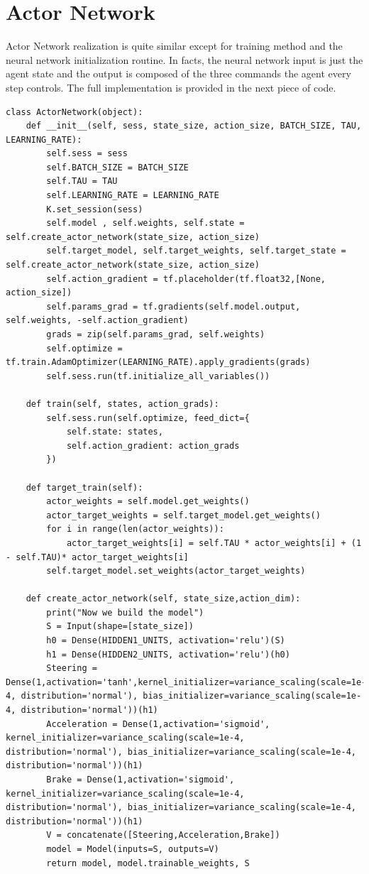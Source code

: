 \documentclass[Lau,oneside,noexaminfo]{sapthesis} %
\begin{document}
\section{Actor Network}
Actor Network realization is quite similar except for training method and the neural network initialization routine. In facts, the neural network input is just the agent state and the output is composed of the three commands the agent every step controls. The full implementation is provided in the next piece of code.
\begin{lstlisting}
class ActorNetwork(object):
    def __init__(self, sess, state_size, action_size, BATCH_SIZE, TAU, LEARNING_RATE):
        self.sess = sess
        self.BATCH_SIZE = BATCH_SIZE
        self.TAU = TAU
        self.LEARNING_RATE = LEARNING_RATE
        K.set_session(sess)
        self.model , self.weights, self.state = self.create_actor_network(state_size, action_size)   
        self.target_model, self.target_weights, self.target_state = self.create_actor_network(state_size, action_size) 
        self.action_gradient = tf.placeholder(tf.float32,[None, action_size])
        self.params_grad = tf.gradients(self.model.output, self.weights, -self.action_gradient)
        grads = zip(self.params_grad, self.weights)
        self.optimize = tf.train.AdamOptimizer(LEARNING_RATE).apply_gradients(grads)
        self.sess.run(tf.initialize_all_variables())

    def train(self, states, action_grads):
        self.sess.run(self.optimize, feed_dict={
            self.state: states,
            self.action_gradient: action_grads
        })

    def target_train(self):
        actor_weights = self.model.get_weights()
        actor_target_weights = self.target_model.get_weights()
        for i in range(len(actor_weights)):
            actor_target_weights[i] = self.TAU * actor_weights[i] + (1 - self.TAU)* actor_target_weights[i]
        self.target_model.set_weights(actor_target_weights)

    def create_actor_network(self, state_size,action_dim):
        print("Now we build the model")
        S = Input(shape=[state_size])   
        h0 = Dense(HIDDEN1_UNITS, activation='relu')(S)
        h1 = Dense(HIDDEN2_UNITS, activation='relu')(h0)
        Steering = Dense(1,activation='tanh',kernel_initializer=variance_scaling(scale=1e-4, distribution='normal'), bias_initializer=variance_scaling(scale=1e-4, distribution='normal'))(h1)
        Acceleration = Dense(1,activation='sigmoid', kernel_initializer=variance_scaling(scale=1e-4, distribution='normal'), bias_initializer=variance_scaling(scale=1e-4, distribution='normal'))(h1)
        Brake = Dense(1,activation='sigmoid', kernel_initializer=variance_scaling(scale=1e-4, distribution='normal'), bias_initializer=variance_scaling(scale=1e-4, distribution='normal'))(h1) 
        V = concatenate([Steering,Acceleration,Brake])          
        model = Model(inputs=S, outputs=V)
        return model, model.trainable_weights, S
\end{lstlisting}
\end{document}
